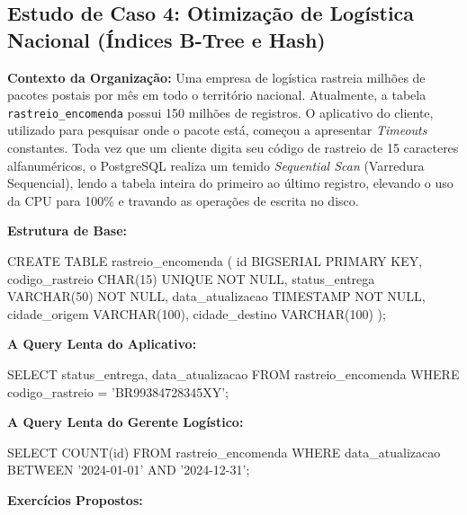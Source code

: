 \subsection{Estudo de Caso 4: Otimização de Logística Nacional (Índices B-Tree e Hash)}

\textbf{Contexto da Organização:}
Uma empresa de logística rastreia milhões de pacotes postais por mês em todo o território nacional. Atualmente, a tabela \texttt{rastreio\_encomenda} possui 150 milhões de registros.
O aplicativo do cliente, utilizado para pesquisar onde o pacote está, começou a apresentar \textit{Timeouts} constantes. Toda vez que um cliente digita seu código de rastreio de 15 caracteres alfanuméricos, o PostgreSQL realiza um temido \textit{Sequential Scan} (Varredura Sequencial), lendo a tabela inteira do primeiro ao último registro, elevando o uso da CPU para 100\% e travando as operações de escrita no disco.

\textbf{Estrutura de Base:}
\begin{sqlcode}
CREATE TABLE rastreio_encomenda (
    id BIGSERIAL PRIMARY KEY,
    codigo_rastreio CHAR(15) UNIQUE NOT NULL,
    status_entrega VARCHAR(50) NOT NULL,
    data_atualizacao TIMESTAMP NOT NULL,
    cidade_origem VARCHAR(100),
    cidade_destino VARCHAR(100)
);
\end{sqlcode}

\textbf{A Query Lenta do Aplicativo:}
\begin{sqlcode}
SELECT status_entrega, data_atualizacao 
FROM rastreio_encomenda 
WHERE codigo_rastreio = 'BR99384728345XY';
\end{sqlcode}

\textbf{A Query Lenta do Gerente Logístico:}
\begin{sqlcode}
SELECT COUNT(id) 
FROM rastreio_encomenda 
WHERE data_atualizacao BETWEEN '2024-01-01' AND '2024-12-31';
\end{sqlcode}

\textbf{Exercícios Propostos:}

